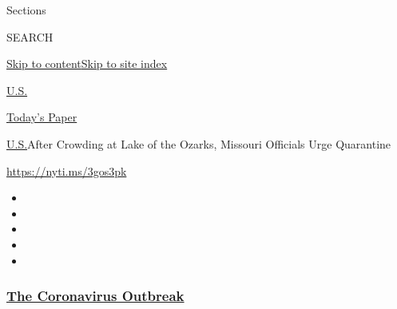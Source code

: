 Sections

SEARCH

\protect\hyperlink{site-content}{Skip to
content}\protect\hyperlink{site-index}{Skip to site index}

\href{https://www.nytimes3xbfgragh.onion/section/us}{U.S.}

\href{https://myaccount.nytimes3xbfgragh.onion/auth/login?response_type=cookie\&client_id=vi}{}

\href{https://www.nytimes3xbfgragh.onion/section/todayspaper}{Today's
Paper}

\href{/section/us}{U.S.}\textbar{}After Crowding at Lake of the Ozarks,
Missouri Officials Urge Quarantine

\url{https://nyti.ms/3gos3pk}

\begin{itemize}
\item
\item
\item
\item
\item
\end{itemize}

\hypertarget{the-coronavirus-outbreak}{%
\subsubsection{\texorpdfstring{\href{https://www.nytimes3xbfgragh.onion/news-event/coronavirus?name=styln-coronavirus-national\&region=TOP_BANNER\&variant=undefined\&block=storyline_menu_recirc\&action=click\&pgtype=Article\&impression_id=da7741f0-e3a1-11ea-9cb4-a7d529c3feb9}{The
Coronavirus
Outbreak}}{The Coronavirus Outbreak}}\label{the-coronavirus-outbreak}}

